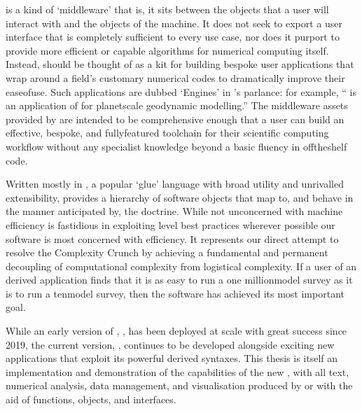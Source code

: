 \documentclass[letterpaper,10pt,english]{jupyterBook}
\begin{document}
\sphinxAtStartPar
{} is a kind of ‘middleware’ \sphinxhyphen{} that is, it sits between the objects that a user will interact with and the objects of the machine. It does not seek to export a user interface that is completely sufficient to every use case, nor does it purport to provide more efficient or capable algorithms for numerical computing itself. Instead,  should be thought of as a kit for building bespoke user applications that wrap around a field’s customary numerical codes to dramatically improve their ease\sphinxhyphen{}of\sphinxhyphen{}use. Such applications are dubbed ‘Engines’ in ’s parlance: for example, “ is an application of  for planet\sphinxhyphen{}scale geodynamic modelling.” The middleware assets provided by  are intended to be comprehensive enough that a user can build an effective, bespoke, and fully\sphinxhyphen{}featured toolchain for their scientific computing workflow without any specialist knowledge beyond a basic fluency in off\sphinxhyphen{}the\sphinxhyphen{}shelf  code.

\sphinxAtStartPar
Written mostly in , a popular ‘glue’ language with broad utility and unrivalled extensibility,  provides a hierarchy of software objects that map to, and behave in the manner anticipated by, the  doctrine. While not unconcerned with machine efficiency \sphinxhyphen{}  is fastidious in exploiting \sphinxhyphen{}level best practices wherever possible \sphinxhyphen{} our software is most concerned with  efficiency. It represents our direct attempt to resolve the Complexity Crunch by achieving a fundamental and permanent decoupling of computational complexity from logistical complexity. If a user of an \sphinxhyphen{}derived application finds that it is as easy to run a one million\sphinxhyphen{}model survey as it is to run a ten\sphinxhyphen{}model survey, then the software has achieved its most important goal.

\sphinxAtStartPar
While an early version of , , has been deployed at scale with great success since 2019, the current version, , continues to be developed alongside exciting new applications that exploit its powerful \sphinxhyphen{}derived syntaxes. This thesis is itself an implementation and demonstration of the capabilities of the new , with all text, numerical analysis, data management, and visualisation produced by or with the aid of  functions, objects, and interfaces.
\end{document}
